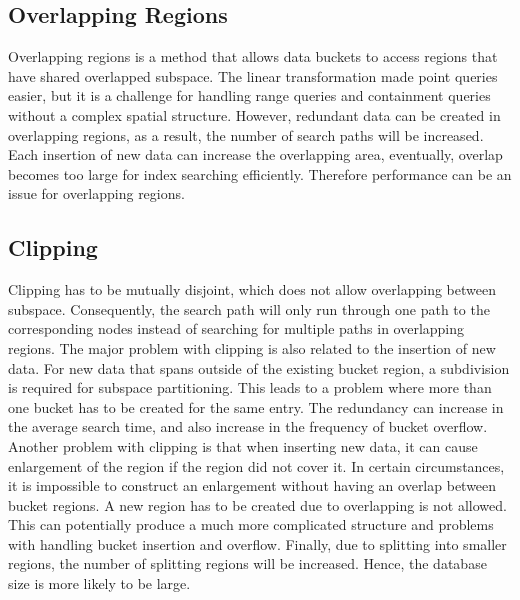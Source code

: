\subsection{Overlapping Regions}
Overlapping regions is a method that allows data buckets to access regions that have shared overlapped subspace. The linear transformation made point queries easier, but it is a challenge for handling range queries and containment queries without a complex spatial structure. However, redundant data can be created in overlapping regions, as a result, the number of search paths will be increased. Each insertion of new data can increase the overlapping area, eventually, overlap becomes too large for index searching efficiently. Therefore performance can be an issue for overlapping regions.

\subsection{Clipping}
Clipping has to be mutually disjoint, which does not allow overlapping between subspace. Consequently, the search path will only run through one path to the corresponding nodes instead of searching for multiple paths in overlapping regions. The major problem with clipping is also related to the insertion of new data. For new data that spans outside of the existing bucket region, a subdivision is required for subspace partitioning. This leads to a problem where more than one bucket has to be created for the same entry. The redundancy \cite{Orenstein:1989wy} can increase in the average search time, and also increase in the frequency of bucket overflow. Another problem with clipping is that when inserting new data, it can cause enlargement of the region if the region did not cover it. In certain circumstances, it is impossible to construct an enlargement without having an overlap between bucket regions. A new region has to be created due to overlapping is not allowed. This can potentially produce a much more complicated structure and problems with handling bucket insertion and overflow. Finally, due to splitting into smaller regions, the number of splitting regions will be increased. Hence, the database size is more likely to be large. 

